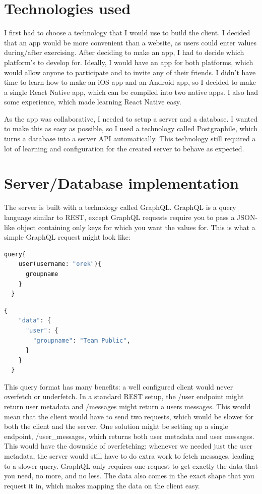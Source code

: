 \documentclass{l4proj}
\begin{document}
\section{Technologies used}
I first had to choose a technology that I would use to build the client. I decided that an app would be more convenient than a website, as users could enter values during/after exercising. After deciding to make an app, I had to decide which platform's to develop for. Ideally, I would have an app for both platforms, which would allow anyone to participate and to invite any of their friends. I didn't have time to learn how to make an iOS app and an Android app, so I decided to make a single React Native app, which can be compiled into two native apps. I also had some experience, which made learning React Native easy.

As the app was collaborative, I needed to setup a server and a database. I wanted to make this as easy as possible, so I used a technology called Postgraphile, which turns a database into a server API automatically. This technology still required a lot of learning and configuration for the created server to behave as expected.

\section{Server/Database implementation}

The server is built with a technology called GraphQL. GraphQL is a query language similar to REST, except GraphQL requests require you to pass a JSON-like object containing only keys for which you want the values for. This is what a simple GraphQL request might look like: 

\begin{lstlisting}[language=python, caption={An example GraphQL query fetching a user's group}, label=lst:callahan]
  query{
    user(username: "orek"){
      groupname
    }
  }
\end{lstlisting}

\begin{lstlisting}[language=python, caption={Response to above query}]
  {
    "data": {
      "user": {
        "groupname": "Team Public",
      }
    }
  }
\end{lstlisting}
This query format has many benefits: a well configured client would never overfetch or underfetch. In a standard REST setup, the /user endpoint might return user metadata and /messages might return a users messages. This would mean that the client would have to send two requests, which would be slower for both the client and the server. One solution might be setting up a single endpoint, /user\_messages, which returns both user metadata and user messages. This would have the downside of overfetching: whenever we needed just the user metadata, the server would still have to do extra work to fetch messages, leading to a slower query. GraphQL only requires one request to get exactly the data that you need, no more, and no less. The data also comes in the exact shape that you request it in, which makes mapping the data on the client easy. 
\end{document}
